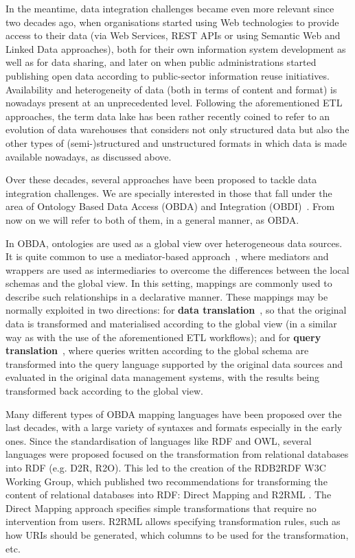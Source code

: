 In the meantime, data integration challenges became even more relevant since two decades ago, when organisations started using Web technologies to provide access to their data (via Web Services, REST APIs or using Semantic Web and Linked Data approaches), both for their own information system development as well as for data sharing, and later on when public administrations started publishing open data according to  public-sector information reuse initiatives. Availability and heterogeneity of data (both in terms of content and format) is nowadays present at an unprecedented level. Following the aforementioned ETL approaches, the term data lake has been rather recently coined to refer to an evolution of data warehouses that considers not only structured data but also the other types of (semi-)structured and unstructured formats in which data is made available nowadays, as discussed above.

Over these decades, several approaches have been proposed to tackle data integration challenges. We are specially interested in those that fall under the area of Ontology Based Data Access (OBDA) and Integration (OBDI)~\citep{poggi2008linking}. From now on we will refer to both of them, in a general manner, as OBDA. 

In OBDA, ontologies are used as a global view over heterogeneous data sources. It is quite common to use a mediator-based approach~\citep{wiederhold1992mediators}, where mediators and wrappers are used as intermediaries to overcome the differences between the local schemas and the global view. In this setting, mappings are commonly used to describe such relationships in a declarative manner. These mappings may be normally exploited in two directions: for \textbf{data translation}~\citep{dimou2014rml}, so that the original data is transformed and materialised according to the global view (in a similar way as with the use of the aforementioned ETL workflows); and for \textbf{query translation}~\citep{priyatna2014formalisation, rodriguez2015efficient}, where queries written according to the global schema are transformed into the query language supported by the original data sources and evaluated in the original data management systems, with the results being transformed back according to the global view.  

Many different types of OBDA mapping languages have been proposed over the last decades, with a large variety of syntaxes and formats especially in the early ones. Since the standardisation of languages like RDF and OWL, several languages were proposed focused on the transformation from relational databases into RDF (e.g. D2R, R2O). This led to the creation of the RDB2RDF W3C Working Group, which published two recommendations for transforming the content of relational databases into RDF: Direct Mapping \citep{arenas2013direct} and R2RML \citep{R2RML}. The Direct Mapping approach specifies simple transformations that require no intervention from users. R2RML allows specifying transformation rules, such as how URIs should be generated, which columns to be used for the transformation, etc.

